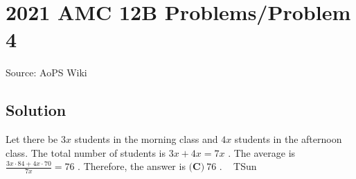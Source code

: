 \documentclass[12pt]{article}
\begin{document}
\section*{{2021 AMC 12B Problems/Problem 4}}
Source: AoPS Wiki

\subsection*{Solution}
Let there be $3x$ students in the morning class and $4x$ students in the afternoon class. The total number of students is $3x + 4x = 7x$ . The average is $\frac{3x\cdot84 + 4x\cdot70}{7x}=76$ . Therefore, the answer is $\boxed{\textbf{(C)} ~76}$ . ~ {TSun} ~
\end{document}
